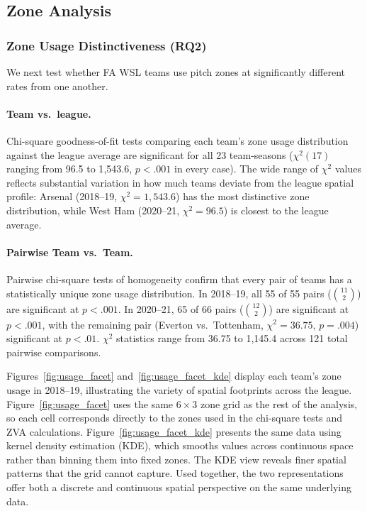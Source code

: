 \documentclass[12pt,a4paper]{article}
\begin{document}
\subsection{Zone Analysis}

\subsubsection{Zone Usage Distinctiveness (RQ2)}\label{sec:rq2}

We next test whether FA WSL teams use pitch zones at significantly different rates from one another.

\paragraph{Team vs.\ league.}
Chi-square goodness-of-fit tests comparing each team's zone usage distribution against the league average are significant for all 23 team-seasons ($\chi^2(17)$ ranging from 96.5 to 1{,}543.6, $p < .001$ in every case). The wide range of $\chi^2$ values reflects substantial variation in how much teams deviate from the league spatial profile: Arsenal (2018--19, $\chi^2 = 1{,}543.6$) has the most distinctive zone distribution, while West Ham (2020--21, $\chi^2 = 96.5$) is closest to the league average.

\paragraph{Pairwise Team vs.\ Team.}
Pairwise chi-square tests of homogeneity confirm that every pair of teams has a statistically unique zone usage distribution. In 2018--19, all 55 of 55 pairs ($\binom{11}{2}$) are significant at $p < .001$. In 2020--21, 65 of 66 pairs ($\binom{12}{2}$) are significant at $p < .001$, with the remaining pair (Everton vs.\ Tottenham, $\chi^2 = 36.75$, $p = .004$) significant at $p < .01$. $\chi^2$ statistics range from 36.75 to 1,145.4 across 121 total pairwise comparisons.

Figures~\ref{fig:usage_facet} and~\ref{fig:usage_facet_kde} display each team's zone usage in 2018--19, illustrating the variety of spatial footprints across the league. Figure~\ref{fig:usage_facet} uses the same $6 \times 3$ zone grid as the rest of the analysis, so each cell corresponds directly to the zones used in the chi-square tests and ZVA calculations. Figure~\ref{fig:usage_facet_kde} presents the same data using kernel density estimation (KDE), which smooths values across continuous space rather than binning them into fixed zones. The KDE view reveals finer spatial patterns that the grid cannot capture. Used together, the two representations offer both a discrete and continuous spatial perspective on the same underlying data.
\end{document}
